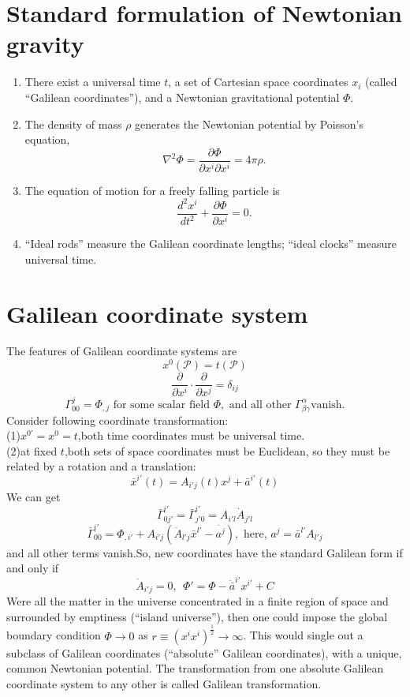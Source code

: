 \section{Standard formulation of Newtonian gravity}
\begin{enumerate}
\item There exist a universal time $t$, a set of Cartesian space coordinates $x_i$ (called ``Galilean coordinates''), and a Newtonian gravitational potential $\Phi$.
\item  The density of mass $\rho$ generates the Newtonian potential by Poisson's equation,
\[\nabla^2\Phi = \frac{\partial \Phi}{\partial x^i \partial x^i} = 4\pi\rho.\]
\item  The equation of motion for a freely falling particle is
\[\frac{d^2 x^i}{dt^2} + \frac{\partial \Phi}{\partial x^i} =0 .\]
\item  ``Ideal rods'' measure the Galilean coordinate lengths; ``ideal clocks'' measure universal time.
\end{enumerate}

\section{Galilean coordinate system}
\noindent
The features of Galilean coordinate systems are
\[x^0(\mathcal{P}) = t(\mathcal{P})\]
\[\frac{\partial}{\partial x^i} \cdot \frac{\partial}{\partial x^j} = \delta_{ij}\]
\[\Gamma^j_{00} = \Phi_{,j} \mbox{ for some scalar field }\Phi,\mbox{ and all other } \Gamma^{\alpha}_{\beta \gamma} \mbox{vanish.}\]
Consider following coordinate transformation:\\
(1)$x^{0'}=x^0=t$,both time coordinates must be universal time.\\
(2)at fixed $t$,both sets of space coordinates must be Euclidean, so they must be related by a rotation and a translation:
\[\bar{x}^{i'}(t) = A_{i'j}(t)x^j + \bar{a}^{i'}(t)\]
We can get
\[\bar{\Gamma}^{i'}_{0j'} = \bar{\Gamma}^{i'}_{j'0} = A_{i'l}\dot{A}_{j'l}\]
\[\bar{\Gamma}^{i'}_{00} = \Phi_{,i'} + A_{i'j}(\ddot{A}_{l'j}\bar{x}^{l'}-\ddot{a^{j}}), \mbox{   here, }a^{j} = \bar{a}^{l'}A_{l'j}\]
and all other terms vanish.So, new coordinates have the standard Galilean form  if and only if
\[\dot{A}_{i'j}=0,\ \ \Phi'=\Phi-\ddot{\bar{a}}^{i'}x^{i'}+C\]
Were all the matter in the universe concentrated in a finite region of space and surrounded by emptiness (``island universe''), then one could impose the global boundary condition $\Phi \to 0$ as $r \equiv (x^ix^i)^{\frac{1}{2}} \to \infty$. This would single out a subclass of Galilean coordinates (``absolute'' Galilean coordinates), with a unique, common Newtonian potential. The transformation from one
absolute Galilean coordinate system to any other is called Galilean transformation.

